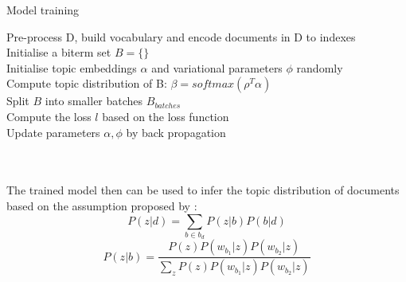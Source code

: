\begin{algorithm}[!htbp]
    \caption{Model training}
    \label{alg:ebtm}
    \LinesNumbered 
    Pre-process D, build vocabulary and encode documents in D to indexes \\
    Initialise a biterm set $B = \{\}$ \\
    Initialise topic embeddings $\alpha$ and variational parameters $\phi$ randomly \\
    {
        Compute topic distribution of B: $\beta = softmax(\rho^T\alpha) $\\
        Split $B$ into smaller batches $B_{batches}$\\
        Compute the loss $l$ based on the loss function \\
        Update parameters $\alpha, \phi$ by back propagation
    }
\end{algorithm}
\\\\The trained model then can be used to infer the topic distribution of documents based on the assumption proposed by \cite{yan2013biterm}:
\begin{equation}
    P(z|d) = \sum_{b\in b_d}P(z|b)P(b|d)
\label{eq:doc1}
\end{equation}
\begin{equation}
    P(z|b) = \frac{P(z)P(w_{b_1}|z)P(w_{b_2}|z)}{\sum_zP(z)P(w_{b_1}|z)P(w_{b_2}|z)}
\label{eq:doc2}
\end{equation}
